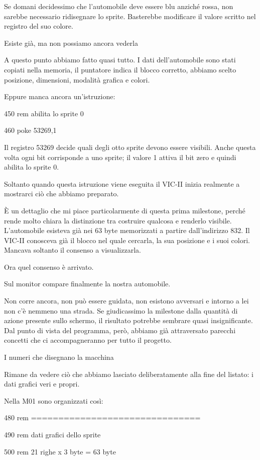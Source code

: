 \documentclass{article}
\begin{document}
Se domani decidessimo che l'automobile deve essere blu anziché rossa, non sarebbe necessario ridisegnare lo sprite.
Basterebbe modificare il valore scritto nel registro del suo colore.

Esiste già, ma non possiamo ancora vederla

A questo punto abbiamo fatto quasi tutto. I dati dell'automobile sono stati copiati nella memoria, il puntatore indica
il blocco corretto, abbiamo scelto posizione, dimensioni, modalità grafica e colori.

Eppure manca ancora un'istruzione:

450 rem abilita lo sprite 0

460 poke 53269,1

Il registro 53269 decide quali degli otto sprite devono essere visibili. Anche questa volta ogni bit corrisponde a uno
sprite; il valore 1 attiva il bit zero e quindi abilita lo sprite 0.

Soltanto quando questa istruzione viene eseguita il VIC-II inizia realmente a mostrarci ciò che abbiamo preparato.

È un dettaglio che mi piace particolarmente di questa prima milestone, perché rende molto chiara la distinzione tra
costruire qualcosa e renderlo visibile. L'automobile esisteva già nei 63 byte memorizzati a partire dall'indirizzo 832.
Il VIC-II conosceva già il blocco nel quale cercarla, la sua posizione e i suoi colori. Mancava soltanto il consenso a
visualizzarla.

Ora quel consenso è arrivato.

Sul monitor compare finalmente la nostra automobile.

Non corre ancora, non può essere guidata, non esistono avversari e intorno a lei non c'è nemmeno una strada. Se
giudicassimo la milestone dalla quantità di azione presente sullo schermo, il risultato potrebbe sembrare quasi
insignificante. Dal punto di vista del programma, però, abbiamo già attraversato parecchi concetti che ci
accompagneranno per tutto il progetto.

I numeri che disegnano la macchina

Rimane da vedere ciò che abbiamo lasciato deliberatamente alla fine del listato: i dati grafici veri e propri.

Nella M01 sono organizzati così:

480 rem ===============================

490 rem dati grafici dello sprite

500 rem 21 righe x 3 byte = 63 byte
\end{document}

